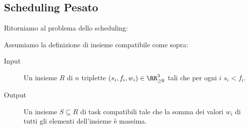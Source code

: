 \documentclass[11pt]{scrartcl}
\begin{document}
	\subsection{Scheduling Pesato}
	
	Ritorniamo al problema dello scheduling:
	\begin{example}
		Assumiamo la definizione di insieme compatibile come sopra:
		\begin{description}
			\item[Input] Un insieme $R$ di $n$ triplette $(s_i,f_i,w_i)\in\RR_{\ge 0}^3$ tali che per ogni $i$ $s_i<f_i$.
			\item[Output] Un insieme $S\subseteq R$ di task compatibili tale che la somma dei valori $w_i$ di tutti gli elementi dell'insieme è massima. 
		\end{description}
	\end{example}
	
\end{document}
